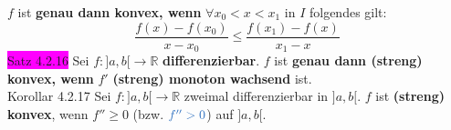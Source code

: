 \documentclass[landscape, 10pt]{article}
\newcommand{\R}{\mathbb{R}}
\begin{document}
\begin{multicols}{3}
                     \textcolor{NavyBlue}{$f$}
                     ist \textbf{genau dann konvex, wenn} 
                     \textcolor{NavyBlue}{$\forall x_0<x<x_1$} in 
                     \textcolor{NavyBlue}{$I$}
                     folgendes gilt: 
                     \begin{equation*}
                           \frac{f(x)-f(x_0)}{x-x_0}
                     \leqslant\frac{f(x_1)-f(x)}{x_1-x} 
                     \end{equation*}
              \colorbox{magenta}{Satz 4.2.16} 
                     Sei \textcolor{NavyBlue}{
                     $f:]a,b[\longrightarrow\R$}
                     \textbf{differenzierbar}. 
                     \textcolor{NavyBlue}{$f$} ist 
                     \textbf{genau dann (streng) konvex, wenn} 
                     \textcolor{NavyBlue}{$f'$} 
                     \textbf{(streng) monoton
                     wachsend} ist.\\
              \colorbox{BurntOrange}{Korollar 4.2.17} 
                     Sei \textcolor{NavyBlue}{
                     $f:]a,b[\longrightarrow\R$}
                     zweimal differenzierbar in 
                     \textcolor{NavyBlue}{$]a,b[$}. 
                     \textcolor{NavyBlue}{$f$} ist \textbf{(streng) konvex}, 
                     wenn \textcolor{NavyBlue}{
                     $f''\geqslant0$} (bzw. 
                     $\textcolor{NavyBlue}{f''>0}$) auf 
                     \textcolor{NavyBlue}{$]a,b[$}.

\end{multicols}
\end{document}
